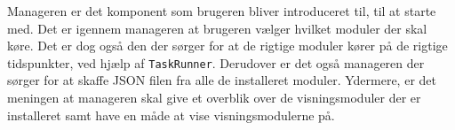 Manageren er det komponent som brugeren bliver introduceret til, til at starte med.
Det er igennem manageren at brugeren vælger hvilket moduler der skal køre.
Det er dog også den der sørger for at de rigtige moduler kører på de rigtige tidspunkter, ved hjælp af \texttt{TaskRunner}.
Derudover er det også manageren der sørger for at skaffe JSON filen fra alle de installeret moduler.
Ydermere, er det meningen at manageren skal give et overblik over de visningsmoduler der er installeret samt have en måde at vise visningsmodulerne på.